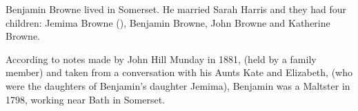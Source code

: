 
Benjamin Browne lived in Somerset. He married Sarah Harris and they had four children: Jemima Browne (), Benjamin Browne, John Browne and Katherine Browne.

According to notes made by John Hill Munday in 1881, (held by a family member) and taken from a conversation with his Aunts Kate and Elizabeth, (who were the daughters of Benjamin's daughter Jemima),  Benjamin was a Maltster in 1798, working near Bath in Somerset.

